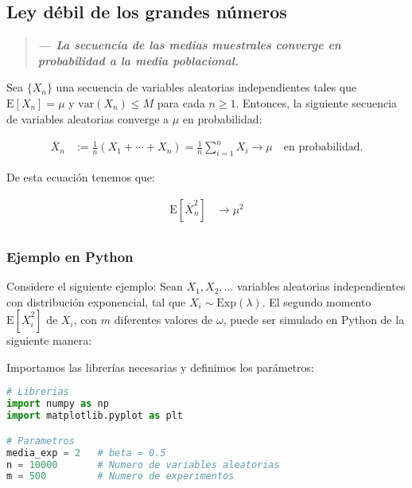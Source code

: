 \documentclass[8pt]{article}
\begin{document}

\subsection{Ley débil de los grandes números}

\begin{quote}
    \textbf{\textit{--- La secuencia de las medias muestrales converge en probabilidad a la media poblacional.}}
\end{quote}

Sea $\{X_n\}$ una secuencia de variables aleatorias independientes tales que $\text{E}[X_n] = \mu$ y $\text{var}(X_n) \leq M$ para cada $n \geq 1$. Entonces, la siguiente secuencia de variables aleatorias converge a $\mu$ en probabilidad:

\begin{align*}
    \overline{X}_n &:= \frac{1}{n}(X_1 + \cdots + X_n) = \frac{1}{n}\sum_{i=1}^n X_i \longrightarrow \mu \quad \text{en probabilidad}.
\end{align*}

De esta ecuación tenemos que:

\begin{align*}
    \text{E}[\overline{X}^2_n] &\rightarrow \mu^2 \\
\end{align*}

\subsubsection{Ejemplo en Python}

Considere el siguiente ejemplo: Sean $X_1, X_2, \ldots$ variables aleatorias independientes con distribución exponencial, tal que $X_i \sim \text{Exp}(\lambda)$. El segundo momento $\text{E}[\overline{X}^2_i]$ de $X_i$, con $m$ diferentes valores de $\omega$, puede ser simulado en Python de la siguiente manera:

\vspace*{0.3cm}

Importamos las librerías necesarias y definimos los parámetros:

\begin{lstlisting}[language=Python]
# Librerias
import numpy as np
import matplotlib.pyplot as plt

# Parametros
media_exp = 2   # beta = 0.5
n = 10000       # Numero de variables aleatorias
m = 500         # Numero de experimentos
\end{lstlisting}
\end{document}
